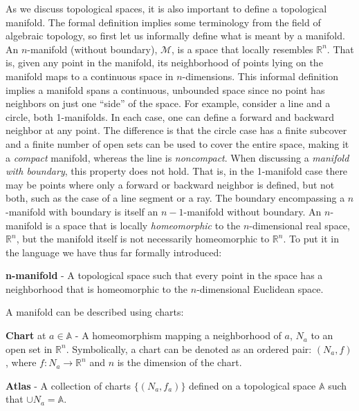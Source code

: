 As we discuss topological spaces, it is also important to define a topological manifold.
%
The formal definition implies some terminology from the field of algebraic topology, so first let us informally define what is meant by a manifold.
%
An $n$-manifold (without boundary), $\mathcal{M}$, is a space that locally resembles $\mathbb{R}^n$.
%
That is, given any point in the manifold, its neighborhood of points lying on the manifold maps to a continuous space in $n$-dimensions.
%
This informal definition implies a manifold spans a continuous, unbounded space since no point has neighbors on just one ``side'' of the space.
%
For example, consider a line and a circle, both 1-manifolds.
%
In each case, one can define a forward and backward neighbor at any point.
%
The difference is that the circle case has a finite subcover and a finite number of open sets can be used to cover the entire space, making it a \emph{compact} manifold, whereas the line is \emph{noncompact}.
%
When discussing a \emph{manifold with boundary}, this property does not hold.
%
That is, in the 1-manifold case there may be points where only a forward or backward neighbor is defined, but not both, such as the case of a line segment or a ray.
%
The boundary encompassing a $n$-manifold with boundary is itself an $n-1$-manifold without boundary.
%
An $n$-manifold is a space that is locally \emph{homeomorphic} to the $n$-dimensional real space, $\mathbb{R}^n$, but the manifold itself is not necessarily homeomorphic to $\mathbb{R}^n$.
%
To put it in the language we have thus far formally introduced:

\begin{defn}
  \textbf{n-manifold} - A topological space such that every point in the space has a neighborhood that is homeomorphic to the $n$-dimensional Euclidean space.
\end{defn}

A manifold can be described using charts:

\begin{defn}
  \textbf{Chart} at $a \in \mathbb{A}$ - A homeomorphism mapping a neighborhood of $a$, $N_a$ to an open set in $\mathbb{R}^n$. Symbolically, a chart can be denoted as an ordered pair: $(N_a,f)$, where $f: N_a \rightarrow \mathbb{R}^n$ and $n$ is the dimension of the chart.
\end{defn}

\begin{defn}
  \textbf{Atlas} - A collection of charts $\{(N_a,f_a)\}$ defined on a topological space $\mathbb{A}$ such that $\cup N_a = \mathbb{A}$.
\end{defn}

